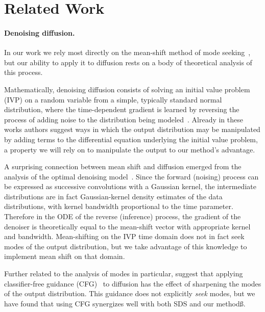 \section{Related Work}
\label{sec:related}

\paragraph{Denoising diffusion.}

In our work we rely most directly on the mean-shift method of mode seeking~\cite{Cheng98,ComaniciuM02Meanshift}, but our ability to apply it to diffusion rests on a body of theoretical analysis of this process.

Mathematically, denoising diffusion consists of solving an initial value problem (IVP) on a random variable from a simple, typically standard normal distribution, where the time-dependent gradient is learned by reversing the process of adding noise to the distribution being modeled~\cite{song2021scorebased,song2021denoising}. Already in these works authors suggest ways in which the output distribution may be manipulated by adding terms to the differential equation underlying the initial value problem, a property we will rely on to manipulate the output to our method's advantage.

A surprising connection between mean shift and diffusion emerged from the analysis of the optimal denoising model~\cite{Karras2022edm,chen2024a}. Since the forward (noising) process can be expressed as successive convolutions with a Gaussian kernel, the intermediate distributions are in fact Gaussian-kernel density estimates of the data distributions, with kernel bandwidth proportional to the time parameter. Therefore in the ODE of the reverse (inference) process, the gradient of the denoiser is theoretically equal to the mean-shift vector with appropriate kernel and bandwidth. Mean-shifting on the IVP time domain does not in fact seek modes of the output distribution, but we take advantage of this knowledge to implement mean shift on that domain.

Further related to the analysis of modes in particular, \citet{karras2024guiding, bradley2024classifierfreeguidancepredictorcorrector} suggest that applying classifier-free guidance (CFG)~\cite{ho2021classifierfree} to diffusion has the effect of sharpening the modes of the output distribution. This guidance does not explicitly \emph{seek} modes, but we have found that using CFG synergizes well with both SDS and our methodß.

